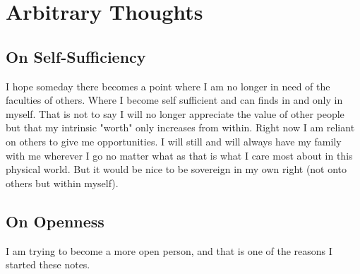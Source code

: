 \chapter{Arbitrary Thoughts}

\newcommand{\thought}[1]{%
    \section{#1}
    \vspace{0.5em}
    \noindent %
}


\thought{On Self-Sufficiency}
\noindent
I hope someday there becomes a point where I am no longer in need of the faculties of others. Where I become self sufficient and can finds in and only in myself. That is not to say I will no longer appreciate the value of other people but that my intrinsic "worth" only increases from within. Right now I am reliant on others to give me opportunities. I will still and will always have my family with me wherever I go no matter what as that is what I care most about in this physical world. But it would be nice to be sovereign in my own right (not onto others but within myself).

\thought{On Openness}
\noindent
I am trying to become a more open person, and that is one of the reasons I started these notes.

